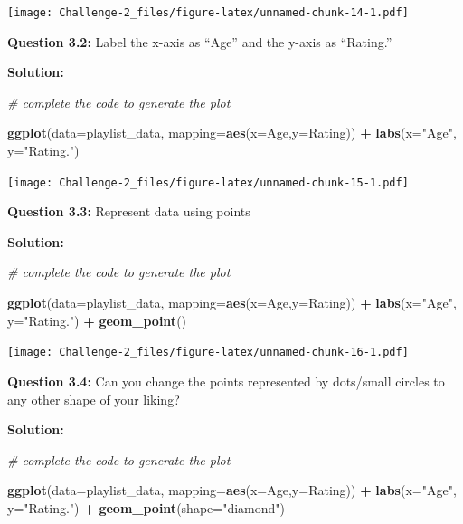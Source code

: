 \documentclass[
]{article}
\newenvironment{Shaded}{\begin{snugshade}}{\end{snugshade}}
\newcommand{\AttributeTok}[1]{\textcolor[rgb]{0.13,0.29,0.53}{#1}}
\newcommand{\CommentTok}[1]{\textcolor[rgb]{0.56,0.35,0.01}{\textit{#1}}}
\newcommand{\FunctionTok}[1]{\textcolor[rgb]{0.13,0.29,0.53}{\textbf{#1}}}
\newcommand{\NormalTok}[1]{#1}
\newcommand{\SpecialCharTok}[1]{\textcolor[rgb]{0.81,0.36,0.00}{\textbf{#1}}}
\newcommand{\StringTok}[1]{\textcolor[rgb]{0.31,0.60,0.02}{#1}}
\begin{document}
\texttt{[image: Challenge-2\_files/figure-latex/unnamed-chunk-14-1.pdf]}

\textbf{Question 3.2:} Label the x-axis as ``Age'' and the y-axis as
``Rating.''

\textbf{Solution:}

\begin{Shaded}
\begin{Highlighting}[]
\CommentTok{\# complete the code to generate the plot}

\FunctionTok{ggplot}\NormalTok{(}\AttributeTok{data=}\NormalTok{playlist\_data, }\AttributeTok{mapping=}\FunctionTok{aes}\NormalTok{(}\AttributeTok{x=}\NormalTok{Age,}\AttributeTok{y=}\NormalTok{Rating)) }\SpecialCharTok{+} \FunctionTok{labs}\NormalTok{(}\AttributeTok{x=}\StringTok{"Age"}\NormalTok{, }\AttributeTok{y=}\StringTok{"Rating."}\NormalTok{)}
\end{Highlighting}
\end{Shaded}

\texttt{[image: Challenge-2\_files/figure-latex/unnamed-chunk-15-1.pdf]}

\textbf{Question 3.3:} Represent data using points

\textbf{Solution:}

\begin{Shaded}
\begin{Highlighting}[]
\CommentTok{\# complete the code to generate the plot}

\FunctionTok{ggplot}\NormalTok{(}\AttributeTok{data=}\NormalTok{playlist\_data, }\AttributeTok{mapping=}\FunctionTok{aes}\NormalTok{(}\AttributeTok{x=}\NormalTok{Age,}\AttributeTok{y=}\NormalTok{Rating)) }\SpecialCharTok{+} \FunctionTok{labs}\NormalTok{(}\AttributeTok{x=}\StringTok{"Age"}\NormalTok{, }\AttributeTok{y=}\StringTok{"Rating."}\NormalTok{) }\SpecialCharTok{+} \FunctionTok{geom\_point}\NormalTok{()}
\end{Highlighting}
\end{Shaded}

\texttt{[image: Challenge-2\_files/figure-latex/unnamed-chunk-16-1.pdf]}

\textbf{Question 3.4:} Can you change the points represented by
dots/small circles to any other shape of your liking?

\textbf{Solution:}

\begin{Shaded}
\begin{Highlighting}[]
\CommentTok{\# complete the code to generate the plot}

\FunctionTok{ggplot}\NormalTok{(}\AttributeTok{data=}\NormalTok{playlist\_data, }\AttributeTok{mapping=}\FunctionTok{aes}\NormalTok{(}\AttributeTok{x=}\NormalTok{Age,}\AttributeTok{y=}\NormalTok{Rating)) }\SpecialCharTok{+} \FunctionTok{labs}\NormalTok{(}\AttributeTok{x=}\StringTok{"Age"}\NormalTok{, }\AttributeTok{y=}\StringTok{"Rating."}\NormalTok{) }\SpecialCharTok{+} \FunctionTok{geom\_point}\NormalTok{(}\AttributeTok{shape=}\StringTok{"diamond"}\NormalTok{)}
\end{Highlighting}
\end{Shaded}
\end{document}
